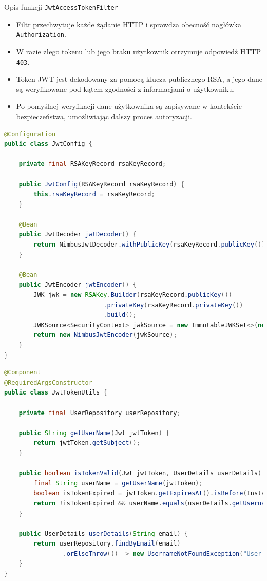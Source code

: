 \noindent Opis funkcji \texttt{JwtAccessTokenFilter}
\begin{itemize}
    \item Filtr przechwytuje każde żądanie HTTP i sprawdza obecność nagłówka \texttt{Authorization}.
    \item W razie złego tokenu lub jego braku użytkownik otrzymuje odpowiedź HTTP \texttt{403}.
    \item Token JWT jest dekodowany za pomocą klucza publicznego RSA, a jego dane są weryfikowane pod kątem zgodności z informacjami o użytkowniku.
    \item Po pomyślnej weryfikacji dane użytkownika są zapisywane w kontekście bezpieczeństwa, umożliwiając dalszy proces autoryzacji.
\end{itemize}

\begin{lstlisting}[language=Java, style=JavaStyle, caption=Klasa \texttt{JwtConfig}]
@Configuration
public class JwtConfig {

    private final RSAKeyRecord rsaKeyRecord;

    public JwtConfig(RSAKeyRecord rsaKeyRecord) {
        this.rsaKeyRecord = rsaKeyRecord;
    }

    @Bean
    public JwtDecoder jwtDecoder() {
        return NimbusJwtDecoder.withPublicKey(rsaKeyRecord.publicKey()).build();
    }

    @Bean
    public JwtEncoder jwtEncoder() {
        JWK jwk = new RSAKey.Builder(rsaKeyRecord.publicKey())
                           .privateKey(rsaKeyRecord.privateKey())
                           .build();
        JWKSource<SecurityContext> jwkSource = new ImmutableJWKSet<>(new JWKSet(jwk));
        return new NimbusJwtEncoder(jwkSource);
    }
}
\end{lstlisting}

\begin{lstlisting}[language=Java, style=JavaStyle, caption=Klasa \texttt{JwtTokenUtils}]
@Component
@RequiredArgsConstructor
public class JwtTokenUtils {

    private final UserRepository userRepository;

    public String getUserName(Jwt jwtToken) {
        return jwtToken.getSubject();
    }

    public boolean isTokenValid(Jwt jwtToken, UserDetails userDetails) {
        final String userName = getUserName(jwtToken);
        boolean isTokenExpired = jwtToken.getExpiresAt().isBefore(Instant.now());
        return !isTokenExpired && userName.equals(userDetails.getUsername());
    }

    public UserDetails userDetails(String email) {
        return userRepository.findByEmail(email)
                .orElseThrow(() -> new UsernameNotFoundException("User not found"));
    }
}
\end{lstlisting}


